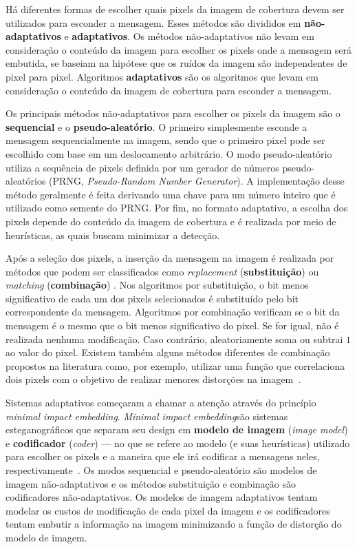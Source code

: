 Há diferentes formas de escolher quais pixels da imagem de cobertura devem ser utilizados para esconder a mensagem. Esses métodos são divididos em \textbf{não-adaptativos} e \textbf{adaptativos}. Os métodos não-adaptativos não levam em consideração o conteúdo da imagem para escolher os pixels onde a mensagem será embutida, se baseiam na hipótese que os ruídos da imagem são independentes de pixel para pixel. Algoritmos \textbf{adaptativos} são os algoritmos que levam em consideração o conteúdo da imagem de cobertura para esconder a mensagem.

Os principais métodos não-adaptativos para escolher os pixels da imagem são o \textbf{sequencial} e o \textbf{pseudo-aleatório}. O primeiro simplesmente esconde a mensagem sequencialmente na imagem, sendo que o primeiro pixel pode ser escolhido com base em um deslocamento arbitrário. O modo pseudo-aleatório utiliza a sequência de pixels definida por um gerador de números pseudo-aleatórios (PRNG, \textit{Pseudo-Random Number Generator}). A implementação desse método geralmente é feita derivando uma chave para um número inteiro que é utilizado como semente do PRNG. Por fim, no formato adaptativo, a escolha dos pixels depende do conteúdo da imagem de cobertura e é realizada por meio de heurísticas, as quais buscam minimizar a detecção.

Após a seleção dos pixels, a inserção da mensagem na imagem é realizada por métodos que podem ser classificados como \textit{replacement} (\textbf{substituição}) ou \textit{matching} (\textbf{combinação}) \cite{ker}. Nos algoritmos por substituição, o bit menos significativo de cada um dos pixels selecionados é substituído pelo bit correspondente da mensagem. Algoritmos por combinação verificam se o bit da mensagem é o mesmo que o bit menos significativo do pixel. Se for igual, não é realizada nenhuma modificação. Caso contrário, aleatoriamente soma ou subtrai $1$ ao valor do pixel. Existem também alguns métodos diferentes de combinação propostos na literatura como, por exemplo, utilizar uma função que correlaciona dois pixels com o objetivo de realizar menores distorções na imagem~\cite{lsb_matching_revised}.

Sistemas adaptativos começaram a chamar a atenção através do princípio \textit{minimal impact embedding}. \textit{Minimal impact embedding}são sistemas esteganográficos que separam seu design em \textbf{modelo de imagem} (\textit{image model}) e \textbf{codificador} (\textit{coder}) --- no que se refere ao modelo (e suas heurísticas) utilizado para escolher os pixels e a maneira que ele irá codificar a mensagens neles, respectivamente~\cite{fridrich2007steganography}. Os modos sequencial e pseudo-aleatório são modelos de imagem não-adaptativos e os métodos substituição e combinação são codificadores não-adaptativos. Os modelos de imagem adaptativos tentam modelar os custos de modificação de cada pixel da imagem e os codificadores tentam embutir a informação na imagem minimizando a função de distorção do modelo de imagem.

